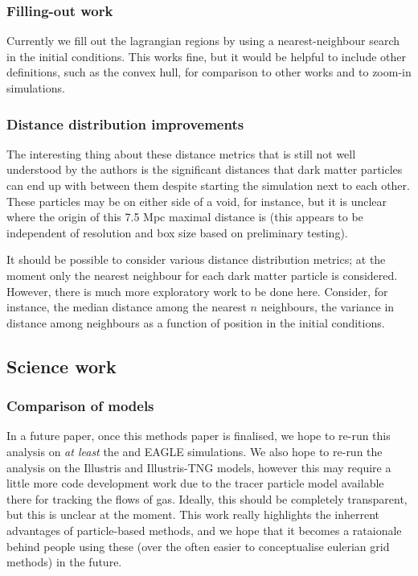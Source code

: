 \subsubsection{Filling-out work}

Currently we fill out the lagrangian regions by using a nearest-neighbour
search in the initial conditions. This works fine, but it would be helpful
to include other definitions, such as the convex hull, for comparison to 
other works and to zoom-in simulations.

\subsubsection{Distance distribution improvements}

The interesting thing about these distance metrics that is still not 
well understood by the authors is the significant distances that dark matter
particles can end up with between them despite starting the simulation
next to each other. These particles may be on either side of a void,
for instance, but it is unclear where the origin of this 7.5 Mpc maximal
distance is (this appears to be independent of resolution and box size
based on preliminary testing).

It should be possible to consider various distance distribution metrics; at the
moment only the nearest neighbour for each dark matter particle is considered.
However, there is much more exploratory work to be done here. Consider, for
instance, the median distance among the nearest $n$ neighbours, the variance in
distance among neighbours as a function of position in the initial conditions.

\subsection{Science work}

\subsubsection{Comparison of models}

In a future paper, once this methods paper is finalised, we hope to re-run
this analysis on \emph{at least} the \mufasa{} and EAGLE simulations. We
also hope to re-run the analysis on the Illustris and Illustris-TNG models,
however this may require a little more code development work due to the
tracer particle model available there for tracking the flows of gas. Ideally,
this should be completely transparent, but this is unclear at the moment.
This work really highlights the inherrent advantages of particle-based
methods, and we hope that it becomes a rataionale behind people using these
(over the often easier to conceptualise eulerian grid methods) in the future.


